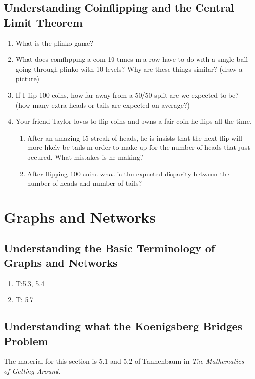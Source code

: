 \documentclass[11pt, letterpaper]{article}
\begin{document}
\subsection{Understanding Coinflipping and the Central Limit Theorem}
\begin{enumerate}
	\item What is the plinko game? 
	\item What does coinflipping a coin 10 times in a row have to do with a single ball going through plinko with 10 levels? Why are these things similar? (draw a picture)
	\item If I flip 100 coins, how far away from a 50/50 split are we expected to be? (how many extra heads or tails are expected on average?)
	\item Your friend Taylor loves to flip coins and owns a fair coin he flips all the time. 
	\begin{enumerate}
		\item After an amazing 15 streak of heads, he is insists that the next flip will more likely be tails in order to make up for the number of heads that just occured. What mistakes is he making?
		\item After flipping 100 coins what is the expected disparity between the number of heads and number of tails?
	\end{enumerate}
\end{enumerate}

\newpage

\section{Graphs and Networks}
 
\subsection{Understanding the Basic Terminology of Graphs and Networks}
\begin{enumerate}
	\item T:5.3, 5.4
	\item T: 5.7
\end{enumerate}

\subsection{Understanding what the Koenigsberg Bridges Problem}
The material for this section is 5.1 and 5.2 of Tannenbaum in \emph{The Mathematics of Getting Around}. 
\end{document}
